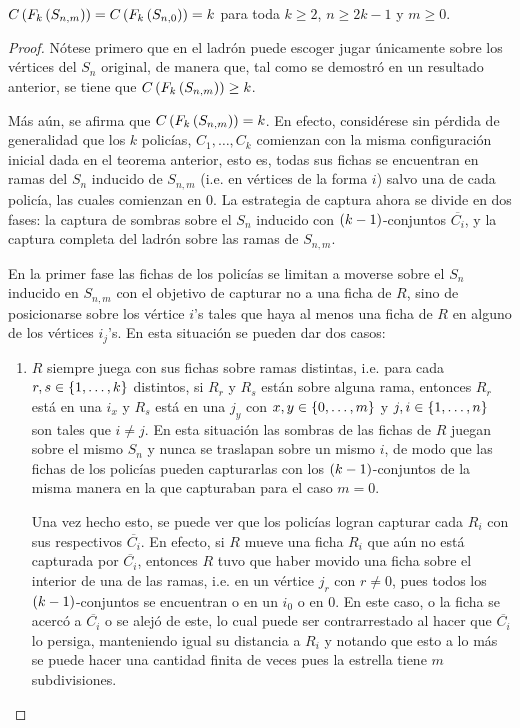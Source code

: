 \begin{teorema}
\label{teo:numero-de-policia-estrella-subdivisiones}
    $C\left( F_k\left( S_{n,m}\right)\right)=C\left( F_k\left( S_{n,0}\right)\right)=k$ para toda $k\geq 2$, $n\geq
    2k-1$ y $m\geq 0$.
\end{teorema}
\begin{proof}
    N\'otese primero que en  el ladr\'on puede escoger jugar \'unicamente sobre
    los v\'ertices del $S_n$ original, de manera que, tal como se demostr\'o en
    un resultado anterior, se tiene que $C\left( F_k\left( S_{n,m}\right)\right)\geq k$.

    M\'as a\'un, se afirma que $C\left( F_k\left( S_{n,m}\right)\right)=k$. En efecto, consid\'erese
    sin p\'erdida de generalidad que los $k$ polic\'ias, $C_1,\dots, C_k$
    comienzan con la misma configuraci\'on inicial dada en el teorema anterior,
    esto es, todas sus fichas se encuentran en ramas del $S_n$ inducido de
    $S_{n,m}$ (i.e. en v\'ertices de la forma $i$) salvo una de cada polic\'ia,
    las cuales comienzan en $0$. La estrategia de captura ahora se divide en dos
    fases: la captura de sombras sobre el $S_n$ inducido con $\left( k-1\right)$-conjuntos
    $\overline{C_i}$, y la captura completa del ladr\'on sobre las ramas de
    $S_{n,m}$.

    En la primer fase las fichas de los polic\'ias se limitan a moverse sobre el
    $S_n$ inducido en $S_{n,m}$ con el objetivo de capturar no a una ficha de
    $R$, sino de posicionarse sobre los v\'ertice $i$'s tales que haya al menos
    una ficha de $R$ en alguno de los v\'ertices $i_j$'s. En esta situaci\'on se
    pueden dar dos casos:
        \begin{enumerate}
            \item $R$ siempre juega con sus fichas sobre ramas distintas, i.e.
            para cada $r,s\in \{1,\dots, k\}$ distintos, si $R_r$ y $R_s$ est\'an
            sobre alguna rama, entonces $R_r$ est\'a en una $i_{x}$ y $R_s$
            est\'a en una $j_{y}$ con $x,y\in \{0,\dots, m\}$ y $j,i\in \{1,\dots, n\}$
            son tales que $i\neq j$. En esta situaci\'on las sombras de las
            fichas de $R$ juegan sobre el mismo $S_n$ y nunca se traslapan sobre
            un mismo $i$, de modo que las fichas de los polic\'ias pueden
            capturarlas con los $\left( k-1\right)$-conjuntos de la misma manera en la que
            capturaban para el caso $m=0$.
            
            Una vez hecho esto, se puede ver que los polic\'ias logran capturar
            cada $R_i$ con sus respectivos $\overline{C_i}$. En efecto, si $R$
            mueve una ficha $R_i$ que a\'un no est\'a capturada por
            $\overline{C_i}$, entonces $R$ tuvo que haber movido una ficha sobre
            el interior de una de las ramas, i.e. en un v\'ertice $j_r$ con
            $r\neq 0$, pues todos los $\left( k-1\right)$-conjuntos se encuentran o en un
            $i_0$ o en $0$. En este caso, o la ficha se acerc\'o a
            $\overline{C_i}$ o se alej\'o de este, lo cual puede ser
            contrarrestado al hacer que $\overline{C_i}$ lo persiga, manteniendo
            igual su distancia a $R_i$ y notando que esto a lo m\'as se puede
            hacer una cantidad finita de veces pues la estrella tiene $m$
            subdivisiones.
            

\end{enumerate}
\end{proof}
